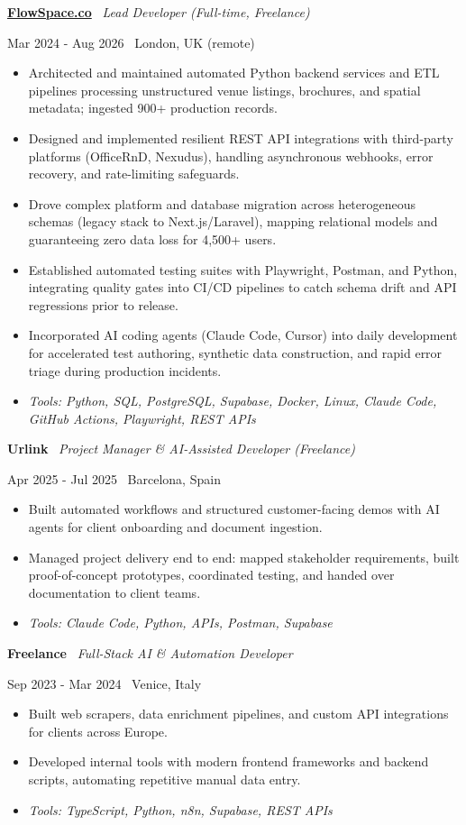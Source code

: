 \documentclass[a4paper,10pt]{article}
\newcommand{\role}[4]{%
 \vspace{2pt}\noindent
 \begin{minipage}[t]{0.70\textwidth}\raggedright\textbf{#1} \textbullet\ \textit{#3}\end{minipage}%
 \hfill
 \begin{minipage}[t]{0.28\textwidth}\raggedleft\footnotesize\color{gray}#2 \textbullet\ #4\end{minipage}%
 \vspace{1pt}%
}
\begin{document}
\role{\href{https://flowspace.co}{FlowSpace.co}}{Mar 2024 - Aug 2026}{Lead Developer (Full-time, Freelance)}{London, UK (remote)}
\begin{itemize}
 \item Architected and maintained automated Python backend services and ETL pipelines processing unstructured venue listings, brochures, and spatial metadata; ingested 900+ production records.
 \item Designed and implemented resilient REST API integrations with third-party platforms (OfficeRnD, Nexudus), handling asynchronous webhooks, error recovery, and rate-limiting safeguards.
 \item Drove complex platform and database migration across heterogeneous schemas (legacy stack to Next.js/Laravel), mapping relational models and guaranteeing zero data loss for 4,500+ users.
 \item Established automated testing suites with Playwright, Postman, and Python, integrating quality gates into CI/CD pipelines to catch schema drift and API regressions prior to release.
 \item Incorporated AI coding agents (Claude Code, Cursor) into daily development for accelerated test authoring, synthetic data construction, and rapid error triage during production incidents.
 \item \textit{Tools: Python, SQL, PostgreSQL, Supabase, Docker, Linux, Claude Code, GitHub Actions, Playwright, REST APIs}
\end{itemize}

\role{Urlink}{Apr 2025 - Jul 2025}{Project Manager \& AI-Assisted Developer (Freelance)}{Barcelona, Spain}
\begin{itemize}
 \item Built automated workflows and structured customer-facing demos with AI agents for client onboarding and document ingestion.
 \item Managed project delivery end to end: mapped stakeholder requirements, built proof-of-concept prototypes, coordinated testing, and handed over documentation to client teams.
 \item \textit{Tools: Claude Code, Python, APIs, Postman, Supabase}
\end{itemize}

\role{Freelance}{Sep 2023 - Mar 2024}{Full-Stack AI \& Automation Developer}{Venice, Italy}
\begin{itemize}
 \item Built web scrapers, data enrichment pipelines, and custom API integrations for clients across Europe.
 \item Developed internal tools with modern frontend frameworks and backend scripts, automating repetitive manual data entry.
 \item \textit{Tools: TypeScript, Python, n8n, Supabase, REST APIs}
\end{itemize}
\end{document}
